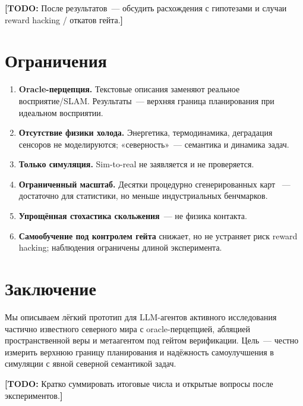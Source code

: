 \documentclass[11pt,a4paper]{article}
\newcommand{\todo}[1]{\textcolor{red!70!black}{\textbf{[TODO:} #1\textbf{]}}}
\begin{document}
\todo{После результатов~--- обсудить расхождения с гипотезами и случаи
reward hacking / откатов гейта.}

\section{Ограничения}
\label{sec:limitations}

\begin{enumerate}[leftmargin=*]
  \item \textbf{Oracle-перцепция.} Текстовые описания заменяют реальное
        восприятие/SLAM. Результаты~--- верхняя граница планирования при
        идеальном восприятии.
  \item \textbf{Отсутствие физики холода.} Энергетика, термодинамика,
        деградация сенсоров не моделируются; «северность»~--- семантика
        и динамика задач.
  \item \textbf{Только симуляция.} Sim-to-real не заявляется и не проверяется.
  \item \textbf{Ограниченный масштаб.} Десятки процедурно сгенерированных карт~
        --- достаточно для статистики, но меньше индустриальных бенчмарков.
  \item \textbf{Упрощённая стохастика скольжения}~--- не физика контакта.
  \item \textbf{Самообучение под контролем гейта} снижает, но не устраняет
        риск reward hacking; наблюдения ограничены длиной эксперимента.
\end{enumerate}

\section{Заключение}
\label{sec:conclusion}

Мы описываем лёгкий прототип для LLM-агентов активного исследования
частично известного северного мира с oracle-перцепцией, абляцией
пространственной веры и метаагентом под гейтом верификации.
Цель~--- честно измерить верхнюю границу планирования и надёжность
самоулучшения в симуляции с явной северной семантикой задач.

\todo{Кратко суммировать итоговые числа и открытые вопросы после экспериментов.}

\printbibliography
\end{document}
